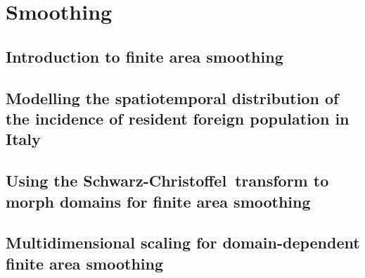 \documentclass[12pt]{report}
\newcommand{\sch}{Schwarz-Christoffel}
\begin{document}
\tableofcontents

\listoffigures

\listoftables

\part{Smoothing}

\chapter{Introduction to finite area smoothing}
%



\chapter{Modelling the spatiotemporal distribution of the incidence of resident foreign population in Italy}



\chapter{Using the \sch\ transform to morph domains for finite area smoothing}
%



\chapter{Multidimensional scaling for domain-dependent finite area smoothing}


\end{document}
